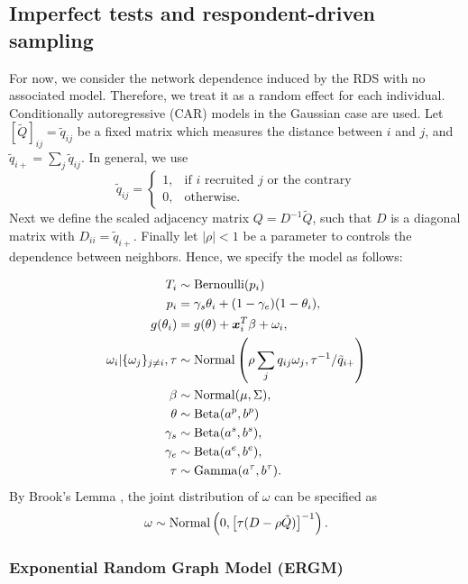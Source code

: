 \subsection{Imperfect tests and respondent-driven sampling}

For now, we consider the network dependence induced by the RDS with no
associated model. Therefore, we treat it as a random effect for
each individual. Conditionally autoregressive (CAR) models in the
Gaussian case are used. Let $[\tilde{Q}]_{ij} = \tilde{q}_{ij}$ be a fixed matrix which measures the distance between $i$
and $j$, and $\tilde{q}_{i+} = \sum_{j} \tilde{q}_{ij}$. In general, we use
$$
\tilde{q}_{ij} = \begin{cases}
  1, &\text{if } i \text{ recruited } j \text{ or the contrary} \\
  0, &\text{otherwise.} 
\end{cases}
$$
Next we define the scaled adjacency matrix $Q = D^{-1}\tilde{Q}$, such that $D$
is a diagonal matrix with $D_{ii} = \tilde{q}_{i+}$. Finally let $|\rho| < 1$ be a
parameter to controls the dependence between neighbors. Hence, we specify the
model as follows:

\begin{equation}
  \begin{aligned}
    T_i &\sim \operatorname{Bernoulli}(p_i) \\
    p_i &= \gamma_s\theta_i + (1-\gamma_e)(1 - \theta_i),  \\
    g(\theta_i) &= g(\theta) + \boldsymbol{x}_i^T\beta + \omega_i,  \\
    \omega_i|\{\omega_j\}_{j\neq i}, \tau &\sim \operatorname{Normal}\left(\rho\sum_j q_{ij}\omega_j, \tau^{-1}/\tilde{q}_{i+}\right) \\
    \beta &\sim \operatorname{Normal}(\mu, \Sigma), \\ 
    \theta &\sim \operatorname{Beta}(a^p, b^p) \\
    \gamma_s &\sim \operatorname{Beta}(a^s, b^s), \\
    \gamma_e &\sim \operatorname{Beta}(a^e, b^e), \\  
    \tau &\sim \operatorname{Gamma}(a^{\tau}, b^{\tau}).
  \end{aligned}  
\end{equation}
By Brook's Lemma \cite[]{brook1964distinction}, the joint distribution of
$\omega$ can be specified as 
$$
\omega \sim \operatorname{Normal}\left(0, \left[\tau (D - \rho \tilde{Q})\right]^{-1}\right).
$$

\subsubsection{Exponential Random Graph Model (ERGM)}


